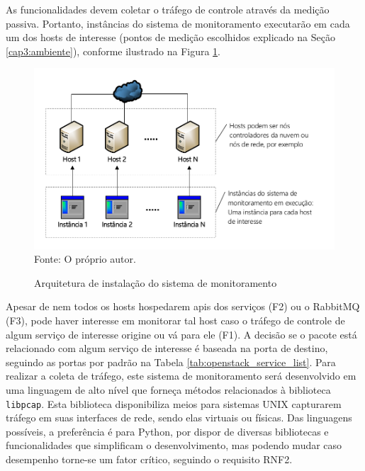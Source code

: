 As funcionalidades devem coletar o tráfego de controle através da medição passiva. 
%
Portanto, instâncias do sistema de monitoramento executarão em cada um dos hosts de interesse (pontos de medição escolhidos explicado na Seção \ref{cap3:ambiente}), conforme ilustrado na Figura \ref{fig:proposta_instalacao}.

\begin{figure}[!htb]
	\centering
	\caption{Arquitetura de instalação do sistema de monitoramento}
    \vspace{-0.5cm}
	\includegraphics[width=.9\textwidth]{img/arquitetura_instalacao.pdf}
	\label{fig:proposta_instalacao}\\
    \vspace{-0.3cm}
	Fonte: O próprio autor.
\end{figure}

Apesar de nem todos os hosts hospedarem \acp{api} dos serviços (F2) ou o RabbitMQ (F3), pode haver interesse em monitorar tal host caso o tráfego de controle de algum serviço de interesse origine ou vá para ele (F1).
%
A decisão se o pacote está relacionado com algum serviço de interesse é baseada na porta de destino, seguindo as portas por padrão na Tabela \ref{tab:openstack_service_list}.
%
Para realizar a coleta de tráfego, este sistema de monitoramento será desenvolvido em uma linguagem de alto nível que forneça métodos relacionados à biblioteca \texttt{libpcap}.
%
Esta biblioteca disponibiliza meios para sistemas UNIX capturarem tráfego em suas interfaces de rede, sendo elas virtuais ou físicas.
%
Das linguagens possíveis, a preferência é para Python, por dispor de diversas bibliotecas e funcionalidades que simplificam o desenvolvimento, mas podendo mudar caso desempenho torne-se um fator crítico, seguindo o requisito RNF2.

